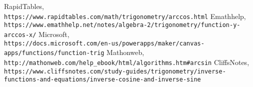 \documentclass{article}
\begin{document}
\begin{thebibliography}{9}
RapidTables,
\\\texttt{https://www.rapidtables.com/math/trigonometry/arccos.html}
Emathhelp,
\\\texttt{https://www.emathhelp.net/notes/algebra-2/trigonometry/function-y-arccos-x/}
Microsoft,
\\\texttt{https://docs.microsoft.com/en-us/powerapps/maker/canvas-apps/functions/function-trig}
Mathonweb,
\\\texttt{http://mathonweb.com/help_ebook/html/algorithms.htm#arcsin}
CliffsNotes,
\\\texttt{https://www.cliffsnotes.com/study-guides/trigonometry/inverse-functions-and-equations/inverse-cosine-and-inverse-sine}
\end{thebibliography}
\end{document}
